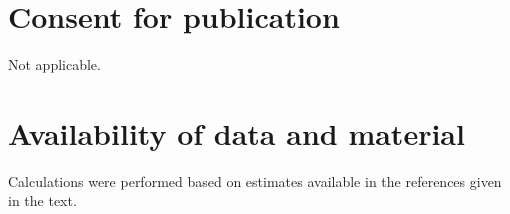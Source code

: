 \documentclass{bmcart}
\begin{document}
\begin{backmatter}
\section*{Consent for publication}
Not applicable.

\section*{Availability of data and material}
Calculations were performed based on estimates available in the references given in the text.








\end{backmatter}
\end{document}
